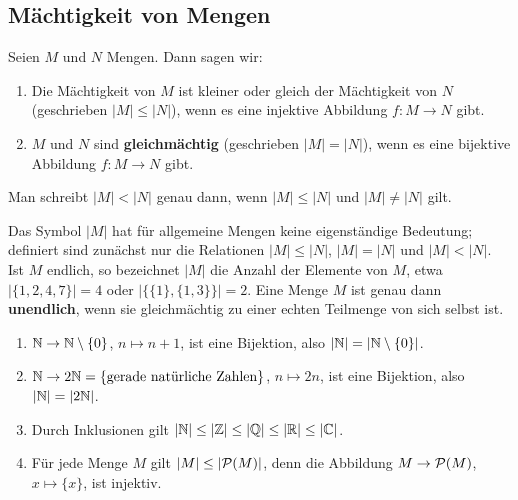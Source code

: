 \subsection{Mächtigkeit von Mengen}

\begin{definition}
Seien $M$ und $N$ Mengen. Dann sagen wir:
\begin{enumerate}
    \item Die Mächtigkeit von $M$ ist kleiner oder gleich der Mächtigkeit
    von $N$ (geschrieben $|M|\le|N|$), wenn es eine injektive Abbildung
    $f:M\to N$ gibt.
    \item $M$ und $N$ sind \textbf{gleichmächtig} (geschrieben $|M|=|N|$),
    wenn es eine bijektive Abbildung $f:M\to N$ gibt.
\end{enumerate}
Man schreibt $|M|<|N|$ genau dann, wenn $|M|\le|N|$ und $|M|\ne|N|$ gilt.
\end{definition}

\begin{bemerkung}
Das Symbol $|M|$ hat für allgemeine Mengen keine eigenständige Bedeutung;
definiert sind zunächst nur die Relationen $|M|\le|N|$, $|M|=|N|$ und
$|M|<|N|$.
Ist $M$ endlich, so bezeichnet $|M|$ die Anzahl der Elemente von $M$,
etwa $|\{1,2,4,7\}|=4$ oder $|\{\{1\},\{1,3\}\}|=2$.
Eine Menge $M$ ist genau dann \textbf{unendlich}, wenn sie gleichmächtig
zu einer echten Teilmenge von sich selbst ist.
\end{bemerkung}

\begin{beispiel}
\begin{enumerate}
    \item $\mathbb{N}\to\mathbb{N}\setminus\{0\}$, $n\mapsto n+1$, ist eine Bijektion,
    also $|\mathbb{N}|=|\mathbb{N}\setminus\{0\}|$.
    \item $\mathbb{N}\to2\mathbb{N}=\{\text{gerade natürliche Zahlen}\}$, $n\mapsto 2n$,
    ist eine Bijektion, also $|\mathbb{N}|=|2\mathbb{N}|$.
    \item Durch Inklusionen gilt $|\mathbb{N}|\le|\mathbb{Z}|\le|\mathbb{Q}|\le|\mathbb{R}|\le|\mathbb{C}|$.
    \item Für jede Menge $M$ gilt $|M|\le|\mathcal{P}(M)|$, denn die Abbildung
    $M\to\mathcal{P}(M)$, $x\mapsto\{x\}$, ist injektiv.
\end{enumerate}
\end{beispiel}


